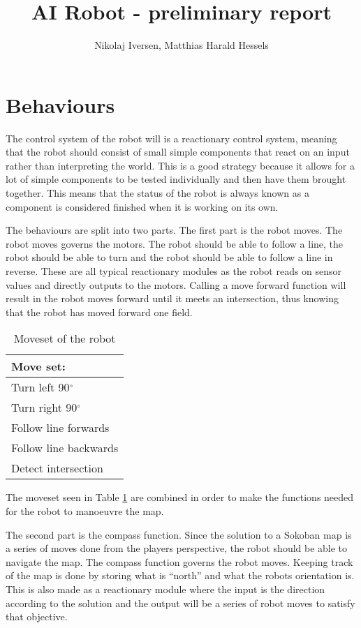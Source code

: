 \documentclass[a4paper,10pt]{article}
\title{AI Robot - preliminary report}
\author{Nikolaj Iversen, Matthias Harald Hessels}
\begin{document}
\maketitle

\section{Behaviours}
The control system of the robot will is a reactionary control system, meaning that the robot should consist of small  simple components that react on an input rather than interpreting the world.
This is a good strategy because it allows for a lot of simple components to be tested individually and then have them brought together.
This means that the status of the robot is always known as a component is considered finished when it is working on its own.

The behaviours are split into two parts.
The first part is the robot moves. 
The robot moves governs the motors. 
The robot should be able to follow a line, the robot should be able to turn and the robot should be able to follow a line in reverse.
These are all typical reactionary modules as the robot reads on sensor values and directly outputs to the motors.
Calling a move forward function will result in the robot moves forward until it meets an intersection, thus knowing that the robot has moved forward one field.

\begin{table}[h!]
\centering
 \begin{tabular}{|l|}
  \hline
  Move set: \\
  \hline
   Turn left 90$^{\circ}$ \\
   Turn right 90$^{\circ}$\\
   Follow line forwards\\
   Follow line backwards\\
   Detect intersection \\
   \hline
 \end{tabular}
\caption{Moveset of the robot}
\label{tab:movset}
\end{table}

The moveset seen in Table \ref{tab:movset} are combined in order to make the functions needed for the robot to manoeuvre the map.

The second part is the compass function.
Since the solution to a Sokoban map is a series of moves done from the players perspective, the robot should be able to navigate the map.
The compass function governs the robot moves.
Keeping track of the map is done by storing what is ``north'' and what the robots orientation is.
This is also made as a reactionary module where the input is the direction according to the solution and the output will be a series of robot moves to satisfy that objective.
\end{document}
